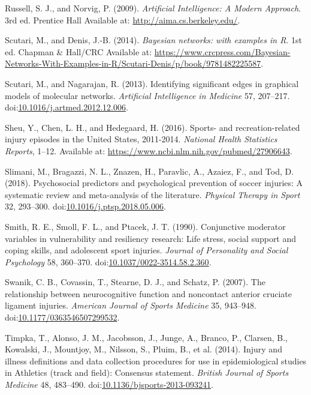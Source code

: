 \documentclass[
]{frontiersHLTH}
\newlength{\cslhangindent}
\newenvironment{cslreferences}%
  {\setlength{\parindent}{0pt}%
  \everypar{\setlength{\hangindent}{\cslhangindent}}\ignorespaces}%
  {\par}
\begin{document}
\begin{cslreferences}
\leavevmode\hypertarget{ref-Norvig2009}{}%
Russell, S. J., and Norvig, P. (2009). \emph{Artificial Intelligence: A
Modern Approach}. 3rd ed. Prentice Hall Available at:
\url{http://aima.cs.berkeley.edu/}.

\leavevmode\hypertarget{ref-Scutari2014}{}%
Scutari, M., and Denis, J.-B. (2014). \emph{Bayesian networks: with
examples in R}. 1st ed. Chapman \& Hall/CRC Available at:
\url{https://www.crcpress.com/Bayesian-Networks-With-Examples-in-R/Scutari-Denis/p/book/9781482225587}.

\leavevmode\hypertarget{ref-Scutari2013}{}%
Scutari, M., and Nagarajan, R. (2013). Identifying significant edges in
graphical models of molecular networks. \emph{Artificial Intelligence in
Medicine} 57, 207--217.
doi:\href{https://doi.org/10.1016/j.artmed.2012.12.006}{10.1016/j.artmed.2012.12.006}.

\leavevmode\hypertarget{ref-Sheu2016}{}%
Sheu, Y., Chen, L. H., and Hedegaard, H. (2016). Sports- and
recreation-related injury episodes in the United States, 2011-2014.
\emph{National Health Statistics Reports}, 1--12. Available at:
\url{https://www.ncbi.nlm.nih.gov/pubmed/27906643}.

\leavevmode\hypertarget{ref-Slimani2018}{}%
Slimani, M., Bragazzi, N. L., Znazen, H., Paravlic, A., Azaiez, F., and
Tod, D. (2018). Psychosocial predictors and psychological prevention of
soccer injuries: A systematic review and meta-analysis of the
literature. \emph{Physical Therapy in Sport} 32, 293--300.
doi:\href{https://doi.org/10.1016/j.ptsp.2018.05.006}{10.1016/j.ptsp.2018.05.006}.

\leavevmode\hypertarget{ref-Smith1990}{}%
Smith, R. E., Smoll, F. L., and Ptacek, J. T. (1990). Conjunctive
moderator variables in vulnerability and resiliency research: Life
stress, social support and coping skills, and adolescent sport injuries.
\emph{Journal of Personality and Social Psychology} 58, 360--370.
doi:\href{https://doi.org/10.1037/0022-3514.58.2.360}{10.1037/0022-3514.58.2.360}.

\leavevmode\hypertarget{ref-Swanik2007}{}%
Swanik, C. B., Covassin, T., Stearne, D. J., and Schatz, P. (2007). The
relationship between neurocognitive function and noncontact anterior
cruciate ligament injuries. \emph{American Journal of Sports Medicine}
35, 943--948.
doi:\href{https://doi.org/10.1177/0363546507299532}{10.1177/0363546507299532}.

\leavevmode\hypertarget{ref-Timpka2014}{}%
Timpka, T., Alonso, J. M., Jacobsson, J., Junge, A., Branco, P.,
Clarsen, B., Kowalski, J., Mountjoy, M., Nilsson, S., Pluim, B., et al.
(2014). Injury and illness definitions and data collection procedures
for use in epidemiological studies in Athletics (track and field):
Consensus statement. \emph{British Journal of Sports Medicine} 48,
483--490.
doi:\href{https://doi.org/10.1136/bjsports-2013-093241}{10.1136/bjsports-2013-093241}.


\end{cslreferences}
\end{document}
